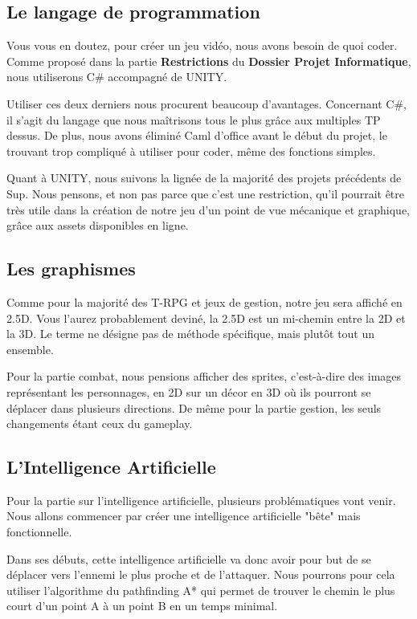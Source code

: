 \documentclass{article}
\begin{document}
\subsection{Le langage de programmation}
Vous vous en doutez, pour créer un jeu vidéo, nous avons besoin de quoi coder. Comme proposé dans la partie \textbf{Restrictions} du \textbf{Dossier Projet Informatique}, nous utiliserons C\# accompagné de UNITY. 

Utiliser ces deux derniers nous procurent beaucoup d'avantages. Concernant C\#, il s'agit du langage que nous maîtrisons tous le plus grâce aux multiples TP dessus. De plus, nous avons éliminé Caml d'office avant le début du projet, le trouvant trop compliqué à utiliser pour coder, même des fonctions simples.

Quant à UNITY, nous suivons la lignée de la majorité des projets précédents de Sup. Nous pensons, et non pas parce que c'est une restriction, qu'il pourrait être très utile dans la création de notre jeu d'un point de vue mécanique et graphique, grâce aux assets disponibles en ligne.

\subsection{Les graphismes}
Comme pour la majorité des T-RPG et jeux de gestion, notre jeu sera affiché en 2.5D. Vous l'aurez probablement deviné, la 2.5D est un mi-chemin entre la 2D et la 3D. Le terme ne désigne pas de méthode spécifique, mais plutôt tout un ensemble. 

Pour la partie combat, nous pensions afficher des sprites, c'est-à-dire des images représentant les personnages, en 2D sur un décor en 3D où ils pourront se déplacer dans plusieurs directions. De même pour la partie gestion, les seuls changements étant ceux du gameplay.


\subsection{L'Intelligence Artificielle}
Pour la partie sur l'intelligence artificielle, plusieurs problématiques vont venir. Nous allons commencer par créer une intelligence artificielle "bête" mais fonctionnelle.

Dans ses débuts, cette intelligence artificielle va donc avoir pour but de se déplacer vers l'ennemi le plus proche et de l'attaquer. Nous pourrons pour cela utiliser l'algorithme du pathfinding A* qui permet de trouver le chemin le plus court d'un point A à un point B en un temps minimal.
\end{document}
